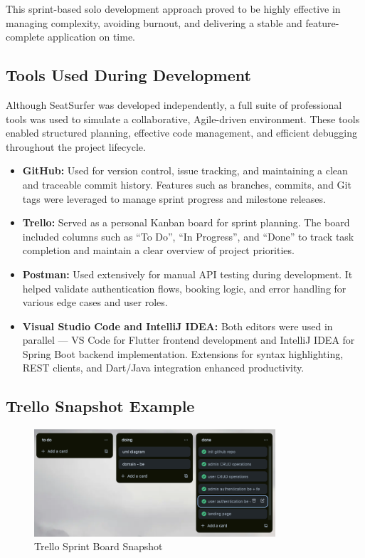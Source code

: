 \documentclass[12pt,a4paper]{report} %
\begin{document}
This sprint-based solo development approach proved to be highly effective in managing complexity, avoiding burnout, and delivering a stable and feature-complete application on time.

\subsection{Tools Used During Development}

Although SeatSurfer was developed independently, a full suite of professional tools was used to simulate a collaborative, Agile-driven environment. These tools enabled structured planning, effective code management, and efficient debugging throughout the project lifecycle.

\begin{itemize}
\item \textbf{GitHub:}
Used for version control, issue tracking, and maintaining a clean and traceable commit history. Features such as branches, commits, and Git tags were leveraged to manage sprint progress and milestone releases.
\item \textbf{Trello:}  
Served as a personal Kanban board for sprint planning. The board included columns such as “To Do”, “In Progress”, and “Done” to track task completion and maintain a clear overview of project priorities.
\item \textbf{Postman:}  
Used extensively for manual API testing during development. It helped validate authentication flows, booking logic, and error handling for various edge cases and user roles.
\item \textbf{Visual Studio Code and IntelliJ IDEA:}  
Both editors were used in parallel — VS Code for Flutter frontend development and IntelliJ IDEA for Spring Boot backend implementation. Extensions for syntax highlighting, REST clients, and Dart/Java integration enhanced productivity.
\end{itemize}

\subsection*{Trello Snapshot Example}

\begin{figure}[H]
    \centering
    \includegraphics[width=0.8\textwidth]{images/trello.png}
    \caption{Trello Sprint Board Snapshot}
    \label{fig:trello}
\end{figure}
\end{document}
